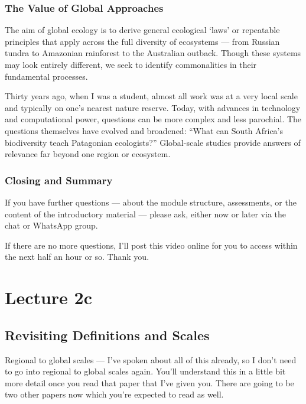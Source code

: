 \documentclass[
  11pt,
]{book}
\begin{document}
\subsection{The Value of Global
Approaches}\label{the-value-of-global-approaches}

The aim of global ecology is to derive general ecological `laws' or
repeatable principles that apply across the full diversity of ecosystems
--- from Russian tundra to Amazonian rainforest to the Australian
outback. Though these systems may look entirely different, we seek to
identify commonalities in their fundamental processes.

Thirty years ago, when I was a student, almost all work was at a very
local scale and typically on one's nearest nature reserve. Today, with
advances in technology and computational power, questions can be more
complex and less parochial. The questions themselves have evolved and
broadened: ``What can South Africa's biodiversity teach Patagonian
ecologists?'' Global-scale studies provide answers of relevance far
beyond one region or ecosystem.

\subsection{Closing and Summary}\label{closing-and-summary}

If you have further questions --- about the module structure,
assessments, or the content of the introductory material --- please ask,
either now or later via the chat or WhatsApp group.

If there are no more questions, I'll post this video online for you to
access within the next half an hour or so. Thank you.

\chapter*{Lecture 2c}\label{lecture-2c}

\section{Revisiting Definitions and
Scales}\label{revisiting-definitions-and-scales}

Regional to global scales --- I've spoken about all of this already, so
I don't need to go into regional to global scales again. You'll
understand this in a little bit more detail once you read that paper
that I've given you. There are going to be two other papers now which
you're expected to read as well.
\end{document}
